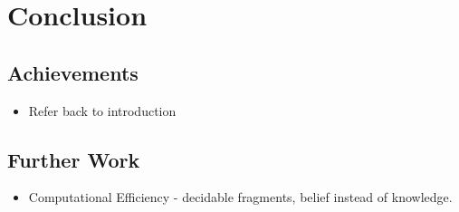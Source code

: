 \chapter{Conclusion}\label{ch:conclusion}

\section{Achievements}

\begin{itemize}
\item Refer back to introduction
\end{itemize}

\section{Further Work}

\begin{itemize}
\item Computational Efficiency - decidable fragments, belief instead of knowledge.
\end{itemize}



